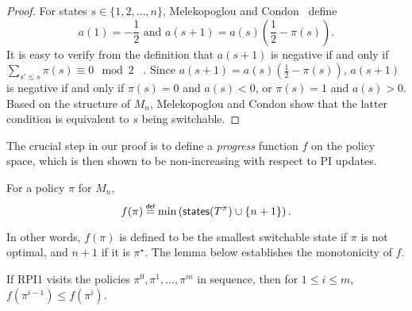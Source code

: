 \begin{appendices}
\begin{proof}
For states $s \in \{1, 2, \dots, n\}$, Melekopoglou and Condon~ define
$$a(1)=-\frac{1}{2}
\text{ and }
a(s+1)=a(s)\left(\frac{1}{2}-\pi(s) \right).$$
It is easy to verify from the definition
that 
$a(s+1)$ is negative if and only if $\sum_{s'\le s}\pi(s) \equiv 0 \mod 2$
~\cite[see Corollary 2.3]{Melekopoglou+Condon:1994}.
Since $a(s+1)=a(s)(\frac{1}{2}-\pi(s))$, $a(s+1)$ is negative if and only if $\pi(s)=0$ and $a(s)<0$, or $\pi(s)=1$ and $a(s)>0$. Based on the structure of $M_{n}$, Melekopoglou and Condon show that the latter condition is equivalent to $s$ being switchable.
\end{proof}

The crucial step in our proof is to define a \textit{progress} function $f$ on the policy space, which is then shown to be non-increasing with respect to PI updates. 

\begin{definition}
\label{d2}
    For a policy $\pi$ for $M_n$, $$f(\pi) \mathrel{\overset{\makebox[0pt]{\mbox{\normalfont\tiny\sffamily def}}}{=}} \min \left(\textsf{states}(T^\pi) \cup \{n+1\}\right).$$
\end{definition}
In other words, $f(\pi)$ is defined to be the smallest switchable state if $\pi$ is not optimal, and $n + 1$ if it is $\pi^{\star}$. The lemma below establishes the monotonicity of $f$.
\begin{lemma}
\label{l3}
    If RPI1 visits the policies $\pi^0, \pi^1, \dots, \pi^m$ in sequence, then for $1\le i \le m$, $f(\pi^{i-1})\le f(\pi^i)$.
\end{lemma}


\end{appendices}
